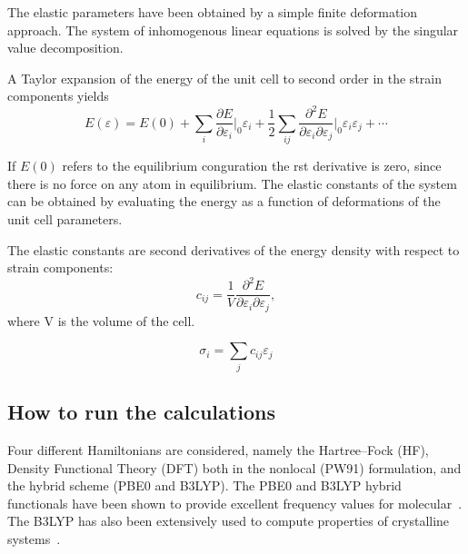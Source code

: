 \documentclass[pra,twocolumn,twocolumngrid,superbib]{revtex4} %
\begin{document}
The elastic parameters have been obtained by a simple finite deformation approach.
The system of inhomogenous linear equations is solved by the singular value decomposition.

A Taylor expansion of the energy of the unit cell to second order in the strain components
yields
\begin{equation}
  E(\varepsilon)=E(0)+\sum_{i}\frac{\partial E}{\partial \varepsilon_{i}}
  \bigg|_{0}\varepsilon_{i}
  +\frac{1}{2}\sum_{ij}\frac{\partial^2 E}{\partial \varepsilon_{i}\partial \varepsilon_{j}}
  \bigg|_{0}\varepsilon_{i}\varepsilon_{j}+\cdots
\end{equation}

If $E(0)$ refers to the equilibrium conguration the rst derivative is zero, since there is no
force on any atom in equilibrium. The elastic constants of the system can be obtained by
evaluating the energy as a function of deformations of the unit cell parameters.

The elastic constants are second derivatives of the energy 
density with respect to strain components:
\begin{equation}
  c_{ij}=\frac{1}{V}\frac{\partial^2 E}{\partial \varepsilon_{i}\partial \varepsilon_{j}},
\end{equation}
where V is the volume of the cell.

\begin{equation}
  \sigma_{i}=\sum_{j}c_{ij}\varepsilon_{j}
\end{equation}


\subsection{How to run the calculations}

Four different Hamiltonians are considered, namely the Hartree–Fock (HF), 
Density Functional Theory (DFT) both in the nonlocal (PW91) formulation, 
and the hybrid scheme (PBE0 and B3LYP). The PBE0 and B3LYP hybrid functionals 
have been shown to provide excellent frequency values for molecular~\cite{WKoch00}. 
The B3LYP has also been extensively used to compute properties of crystalline 
systems~\cite{PBaranek01,RDovesi98,MCatti00,FPascale02,BCivalleri99,BCivalleri00}.

\end{document}
